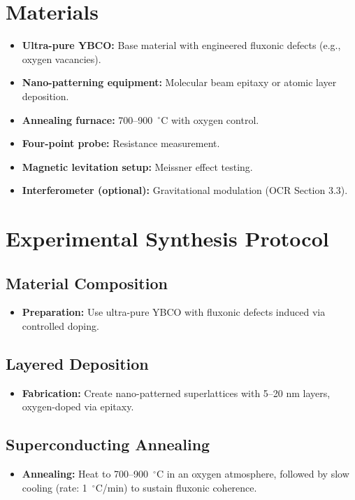 \documentclass[a4paper,12pt]{article}
\begin{document}
\section{Materials}
\begin{itemize}
    \item \textbf{Ultra-pure YBCO:} Base material with engineered fluxonic defects (e.g., oxygen vacancies).
    \item \textbf{Nano-patterning equipment:} Molecular beam epitaxy or atomic layer deposition.
    \item \textbf{Annealing furnace:} 700--900~$^\circ$C with oxygen control.
    \item \textbf{Four-point probe:} Resistance measurement.
    \item \textbf{Magnetic levitation setup:} Meissner effect testing.
    \item \textbf{Interferometer (optional):} Gravitational modulation (OCR Section 3.3).
\end{itemize}

\section{Experimental Synthesis Protocol}
\subsection{Material Composition}
\begin{itemize}
    \item \textbf{Preparation:} Use ultra-pure YBCO with fluxonic defects induced via controlled doping.
\end{itemize}

\subsection{Layered Deposition}
\begin{itemize}
    \item \textbf{Fabrication:} Create nano-patterned superlattices with 5--20 nm layers, oxygen-doped via epitaxy.
\end{itemize}

\subsection{Superconducting Annealing}
\begin{itemize}
    \item \textbf{Annealing:} Heat to 700--900~$^\circ$C in an oxygen atmosphere, followed by slow cooling (rate: 1~$^\circ$C/min) to sustain fluxonic coherence.
\end{itemize}
\end{document}
